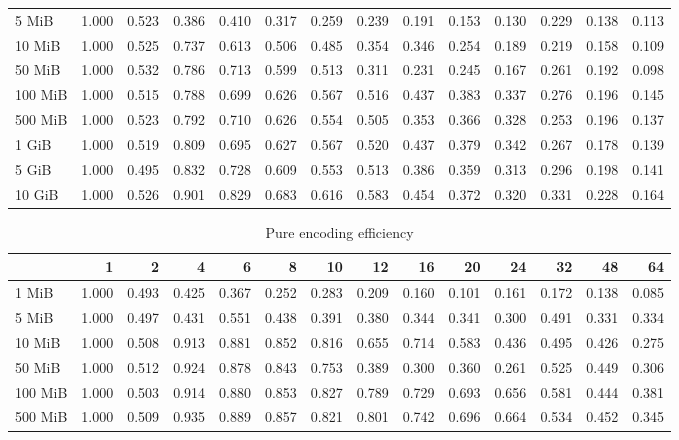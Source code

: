 \begin{centering}
\begin{table}[!h]
\begin{tabular}{lrrrrrrrrrrrrr}
		5 MiB   & 1.000 & 0.523 & 0.386 & 0.410 & 0.317 & 0.259 & 0.239 & 0.191 & 0.153 & 0.130 & 0.229 & 0.138 & 0.113 \\
		10 MiB  & 1.000 & 0.525 & 0.737 & 0.613 & 0.506 & 0.485 & 0.354 & 0.346 & 0.254 & 0.189 & 0.219 & 0.158 & 0.109 \\
		50 MiB  & 1.000 & 0.532 & 0.786 & 0.713 & 0.599 & 0.513 & 0.311 & 0.231 & 0.245 & 0.167 & 0.261 & 0.192 & 0.098 \\
		100 MiB & 1.000 & 0.515 & 0.788 & 0.699 & 0.626 & 0.567 & 0.516 & 0.437 & 0.383 & 0.337 & 0.276 & 0.196 & 0.145 \\
		500 MiB & 1.000 & 0.523 & 0.792 & 0.710 & 0.626 & 0.554 & 0.505 & 0.353 & 0.366 & 0.328 & 0.253 & 0.196 & 0.137 \\
		1 GiB   & 1.000 & 0.519 & 0.809 & 0.695 & 0.627 & 0.567 & 0.520 & 0.437 & 0.379 & 0.342 & 0.267 & 0.178 & 0.139 \\
		5 GiB   & 1.000 & 0.495 & 0.832 & 0.728 & 0.609 & 0.553 & 0.513 & 0.386 & 0.359 & 0.313 & 0.296 & 0.198 & 0.141 \\
		10 GiB  & 1.000 & 0.526 & 0.901 & 0.829 & 0.683 & 0.616 & 0.583 & 0.454 & 0.372 & 0.320 & 0.331 & 0.228 & 0.164 \\
		\bottomrule
	\end{tabular}
\end{table}
\begin{table}[!h]
	\caption{Pure encoding efficiency}
	\begin{tabular}{lrrrrrrrrrrrrr}
		\toprule
		\diagbox[width=7em]{Size}{Threads} &    1  &    2  &    4  &    6  &    8  &    10 &    12 &    16 &    20 &    24 &    32 &    48 &    64 \\
		\midrule
		1 MiB   & 1.000 & 0.493 & 0.425 & 0.367 & 0.252 & 0.283 & 0.209 & 0.160 & 0.101 & 0.161 & 0.172 & 0.138 & 0.085 \\
		5 MiB   & 1.000 & 0.497 & 0.431 & 0.551 & 0.438 & 0.391 & 0.380 & 0.344 & 0.341 & 0.300 & 0.491 & 0.331 & 0.334 \\
		10 MiB  & 1.000 & 0.508 & 0.913 & 0.881 & 0.852 & 0.816 & 0.655 & 0.714 & 0.583 & 0.436 & 0.495 & 0.426 & 0.275 \\
		50 MiB  & 1.000 & 0.512 & 0.924 & 0.878 & 0.843 & 0.753 & 0.389 & 0.300 & 0.360 & 0.261 & 0.525 & 0.449 & 0.306 \\
		100 MiB & 1.000 & 0.503 & 0.914 & 0.880 & 0.853 & 0.827 & 0.789 & 0.729 & 0.693 & 0.656 & 0.581 & 0.444 & 0.381 \\
		500 MiB & 1.000 & 0.509 & 0.935 & 0.889 & 0.857 & 0.821 & 0.801 & 0.742 & 0.696 & 0.664 & 0.534 & 0.452 & 0.345 \\

\end{tabular}
\end{table}
\end{centering}
